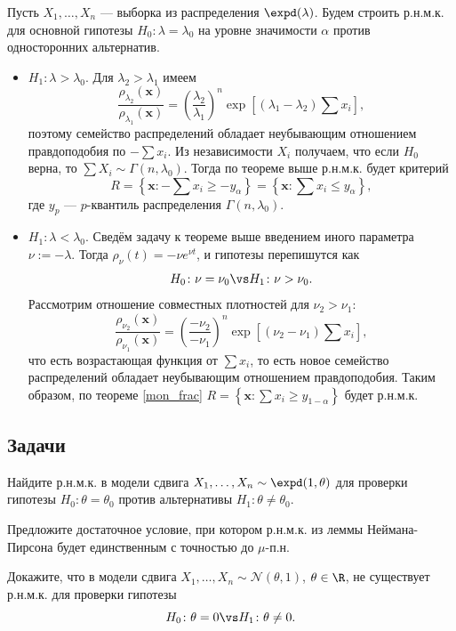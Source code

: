 \begin{example}
Пусть $X_1, \ldots, X_n$ --- выборка из распределения $\expd(\lambda)$. Будем строить р.н.м.к. для основной гипотезы  $H_0\colon \lambda = \lambda_0$ на уровне значимости $\alpha$ против односторонних альтернатив.

\begin{itemize}
    \item $H_1\colon \lambda > \lambda_0$. Для $\lambda_2 > \lambda_1$ имеем
    \[
    \frac{\rho_{\lambda_2}(\mathbf{x})}{\rho_{\lambda_1}(\mathbf{x})} = 
    \left(\frac{\lambda_2}{\lambda_1}\right)^n \exp{\left[(\lambda_1 - \lambda_2)\sum x_i\right]},
    \]
    поэтому семейство распределений обладает неубывающим отношением правдоподобия по $-\sum x_i$. Из независимости $X_i$ получаем, что если $H_0$ верна, то $\sum X_i \sim \Gamma(n, \lambda_0)$. Тогда по теореме выше р.н.м.к. будет критерий
    $$R = \left\{\mathbf{x}\colon -\sum x_i \ge -y_{\alpha}\right\} = \left\{\mathbf{x}\colon \sum x_i \le y_{\alpha}\right\},$$
    где $y_{p}$ --- $p$-квантиль распределения $\Gamma(n, \lambda_0)$.

    \item $H_1\colon \lambda < \lambda_0$. Сведём задачу к теореме выше введением иного параметра $\nu := -\lambda$. Тогда $\rho_{\nu}(t)=-\nu e^{\nu t}$, и гипотезы перепишутся как
    \[
    H_0\colon \nu = \nu_0 \vs H_1\colon \nu > \nu_0.
    \]
    Рассмотрим отношение совместных плотностей для $\nu_2 > \nu_1$:
    \[
    \frac{\rho_{\nu_2}(\mathbf{x})}{\rho_{\nu_1}(\mathbf{x})} = 
    \left(\frac{-\nu_2}{-\nu_1}\right)^n \exp{\left[(\nu_2 - \nu_1)\sum x_i\right]},
    \]
    что есть возрастающая функция от $\sum x_i$, то есть новое семейство распределений обладает неубывающим отношением правдоподобия. Таким образом, по теореме \ref{mon_frac} $R = \left\{\mathbf{x}\colon\sum x_i \ge y_{1-\alpha}\right\}$ будет р.н.м.к.
\end{itemize}
\end{example}

\subsection*{Задачи}

\begin{problem}
	Найдите р.н.м.к. в модели сдвига $X_1, \ldots, X_n \sim \expd(1, \theta)$ для проверки гипотезы $H_0\colon \theta = \theta_0$ против альтернативы $H_1\colon \theta \ne \theta_0$.
\end{problem}

\begin{problem}
	Предложите достаточное условие, при котором р.н.м.к. из леммы Неймана-Пирсона будет единственным с точностью до $\mu$-п.н.
\end{problem}

\begin{problem}
    Докажите, что в модели сдвига $X_1, \ldots, X_n \sim \mathcal{N}(\theta, 1)$, $\theta \in \R$, не существует р.н.м.к. для проверки гипотезы
    \[
    H_0\colon \theta = 0 \vs H_1\colon \theta \ne 0.
    \]
\end{problem}





